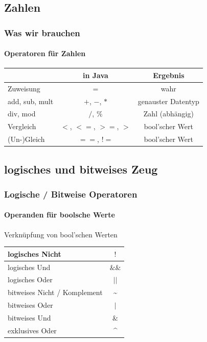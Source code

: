 \documentclass[18pt]{beamer}
\begin{document}
\subsection{Zahlen}
\begin{frame}
	\frametitle{Was wir brauchen}
	\framesubtitle{Operatoren für Zahlen}
	
	\begin{tabular}[ht]{|l|c|c|}
		\hline
								& \textbf{in Java}		&	\textbf{Ergebnis}	\\
		\hline
		Zuweisung 				& = 					&	wahr				\\ %
		\hline
		add, sub, mult 			& $+$, $-$, $*$ 		&	genauster Datentyp	\\
		\hline
		div, mod 				& $/$, $\%$			 	&	Zahl (abhängig)		\\ %
		\hline
		Vergleich 				& $<$, $<=$, $>=$, $>$ 	&	bool'scher Wert		\\
		\hline
		(Un-)Gleich			 	& $==$, $!=$ 			&	bool'scher Wert		\\
		\hline
	\end{tabular}
\end{frame}



\subsection{logisches und bitweises Zeug}
\begin{frame}
	\frametitle{Logische / Bitweise Operatoren}
	\framesubtitle{Operanden für boolsche Werte}
	
	Verknüpfung von bool'schen Werten
	
	
	\begin{tabular}[ht]{|l|c|}
		\hline
		logisches Nicht & $!$ \\
		\hline
		logisches Und & $\&\&$ \\
		\hline
		logisches Oder & $||$ \\
		\hline
		bitweises Nicht / Komplement & \textasciitilde \\
		\hline
		bitweises Oder & $|$ \\
		\hline
		bitweises Und & $\&$ \\
		\hline
		exklusives Oder & \^{} \\
		\hline
	\end{tabular}
\end{frame}

\end{document}
